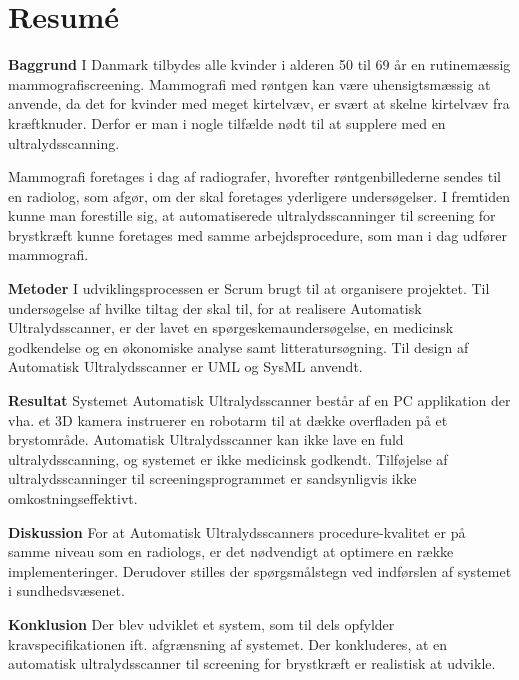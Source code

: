 \chapter{Resumé}
\textbf{Baggrund} \newline
I Danmark tilbydes alle kvinder i alderen 50 til 69 år en rutinemæssig mammografiscreening. Mammografi med røntgen kan være uhensigtsmæssig at anvende, da det for kvinder med meget kirtelvæv, er svært at skelne kirtelvæv fra kræftknuder. Derfor er man i nogle tilfælde nødt til at supplere med en ultralydsscanning.

Mammografi foretages i dag af radiografer, hvorefter røntgenbillederne sendes til en radiolog, som afgør, om der skal foretages yderligere undersøgelser. I fremtiden kunne man forestille sig, at automatiserede ultralydsscanninger til screening for brystkræft kunne foretages med samme arbejdsprocedure, som man i dag udfører mammografi.

\textbf{Metoder} \newline
I udviklingsprocessen er Scrum brugt til at organisere projektet. Til undersøgelse af hvilke tiltag der skal til, for at realisere Automatisk Ultralydsscanner, er der lavet en spørgeskemaundersøgelse, en medicinsk godkendelse og en økonomiske analyse samt litteratursøgning. Til design af Automatisk Ultralydsscanner er UML og SysML anvendt. 

\textbf{Resultat} \newline
Systemet Automatisk Ultralydsscanner består af en PC applikation der vha. et 3D kamera instruerer en robotarm til at dække overfladen på et brystområde. Automatisk Ultralydsscanner kan ikke lave en fuld ultralydsscanning, og systemet er ikke medicinsk godkendt. Tilføjelse af ultralydsscanninger til screeningsprogrammet er sandsynligvis ikke omkostningseffektivt.

\textbf{Diskussion} \newline
For at Automatisk Ultralydsscanners procedure-kvalitet er på samme niveau som en radiologs, er det nødvendigt at optimere en række implementeringer. Derudover stilles der spørgsmålstegn ved indførslen af systemet i sundhedsvæsenet.

\textbf{Konklusion} \newline
Der blev udviklet et system, som til dels opfylder kravspecifikationen ift. afgrænsning af systemet. Der konkluderes, at en automatisk ultralydsscanner til screening for brystkræft er realistisk at udvikle.